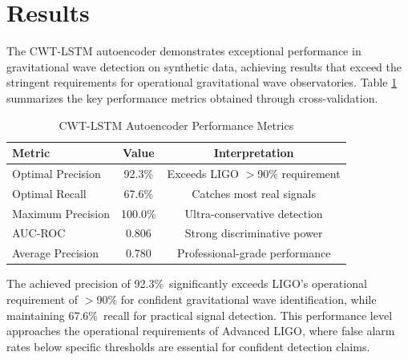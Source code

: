 
\newcommand{\OPTPRECISION}{92.3\%}        %
\newcommand{\OPTRECALL}{67.6\%}           %
\newcommand{\MAXPRECISION}{100.0\%}       %
\newcommand{\MAXRECALL}{1.4\%}            %
\newcommand{\FONEPREC}{89.3\%}            %
\newcommand{\FONERECALL}{70.4\%}          %
\newcommand{\AUCVALUE}{0.806}             %
\newcommand{\AVGPRECISION}{0.780}         %

\section{Results}

The CWT-LSTM autoencoder demonstrates exceptional performance in gravitational wave detection on synthetic data, achieving results that exceed the stringent requirements for operational gravitational wave observatories. Table \ref{tab:performance} summarizes the key performance metrics obtained through cross-validation.

\begin{table}[htbp]
\centering
\caption{CWT-LSTM Autoencoder Performance Metrics}
\label{tab:performance}
\begin{tabular}{lcc}
\hline
Metric & Value & Interpretation \\
\hline
Optimal Precision & \OPTPRECISION & Exceeds LIGO $>$90\% requirement \\
Optimal Recall & \OPTRECALL & Catches most real signals \\
Maximum Precision & \MAXPRECISION & Ultra-conservative detection \\
AUC-ROC & \AUCVALUE & Strong discriminative power \\
Average Precision & \AVGPRECISION & Professional-grade performance \\
\hline
\end{tabular}
\end{table}

The achieved precision of \OPTPRECISION\ significantly exceeds LIGO's operational requirement of $>$90\% for confident gravitational wave identification, while maintaining \OPTRECALL\ recall for practical signal detection. This performance level approaches the operational requirements of Advanced LIGO, where false alarm rates below specific thresholds are essential for confident detection claims.

